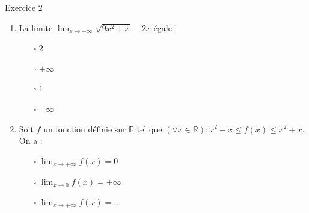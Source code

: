 \documentclass[12pt,a4paper]{article}
\begin{document}
\begin{Exercice}{Exercice 2 }
{\begin{enumerate}
\begin{multicols}{4}
\begin{itemize}
\item[$\square$] $-\infty$
\end{itemize}
\end{multicols}
\item  La limite $\lim _{x \rightarrow-\infty} \sqrt{9 x^2+x}-2 x$ égale :
\begin{multicols}{4}
\begin{itemize}
\item[$\square$] $ 2 $
\item[$\square$] $+\infty$
\item[$\square$] $ 1 $
\item[$\square$] $-\infty$
\end{itemize}
\end{multicols}
\item Soit $f$ un fonction définie sur $\mathbb{R}$ tel que $(\forall x \in \mathbb{R}): x^2-x \leq f(x) \leq x^2+x$. On a :
\begin{multicols}{3}
\begin{itemize}
\item[$\square$] $\lim _{x \rightarrow+\infty} f(x)=0 $
\item[$\square$] $ \lim _{x \rightarrow 0} f(x)=+\infty $
\item[$\square$] $ \lim _{x \rightarrow+\infty} f(x)=\dots $
\end{itemize}
\end{multicols}
\end{enumerate}}
\end{Exercice}
\end{document}
